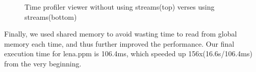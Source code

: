 \documentclass[journal,11pt,onecolumn,draftclsnofoot]{ieeeconf}  %
\begin{document}
\begin{figure}[!tbp]
	\centering
	\begin{minipage}[b]{1\textwidth}
	\end{minipage}
	\begin{minipage}[b]{1\textwidth}
	\end{minipage}
	
	\caption{Time profiler viewer without using streams(top) verses using streams(bottom)}
	\label{viewer}
\end{figure}
Finally, we used shared memory to avoid wasting time to read from global memory each time, and thus further improved the performance. Our final execution time for lena.ppm is 106.4ms, which speeded up 156x(16.6s/106.4ms) from the very beginning.

\clearpage
\appendix
\end{document}

